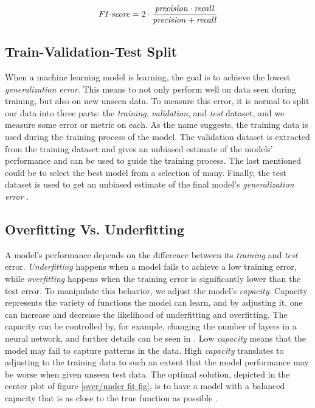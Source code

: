         \begin{equation}
            \textrm{\textit{F1-score}} = 2 \cdot \dfrac{\textrm{\textit{precision}} \cdot \textrm{\textit{recall}}}{\textrm{\textit{precision}} + \textrm{\textit{recall}}}
        \end{equation}
        
        
        
    \subsection{Train-Validation-Test Split}
        When a machine learning model is learning, the goal is to achieve the lowest \textit{generalization error}. This means to not only perform well on data seen during training, but also on new unseen data. To measure this error, it is normal to split our data into three parts: the \textit{training}, \textit{validation}, and \textit{test} dataset, and we measure some error or metric on each. As the name suggests, the training data is used during the training process of the model. The validation dataset is extracted from the training dataset and gives an unbiased estimate of the models' performance and can be used to guide the training process. The last mentioned could be to select the best model from a selection of many. Finally, the test dataset is used to get an unbiased estimate of the final model's \textit{generalization error} \cite{Goodfellow-et-al-2016}.
    
    \subsection{Overfitting Vs. Underfitting}
        A model's performance depends on the difference between its \textit{training} and \textit{test} error. \textit{Underfitting} happens when a model fails to achieve a low training error, while \textit{overfitting} happens when the training error is significantly lower than the test error. To manipulate this behavior, we adjust the model's \textit{capacity}. Capacity represents the variety of functions the model can learn, and by adjusting it, one can increase and decrease the likelihood of underfitting and overfitting. The capacity can be controlled by, for example, changing the number of layers in a neural network, and further details can be seen in \citeauthor{Goodfellow-et-al-2016} \cite{Goodfellow-et-al-2016}. Low \textit{capacity} means that the model may fail to capture patterns in the data. High \textit{capacity} translates to adjusting to the training data to such an extent that the model performance may be worse when given unseen test data. The optimal solution, depicted in the center plot of figure \ref{over/under fit fig}, is to have a model with a balanced capacity that is as close to the true function as possible \cite{Goodfellow-et-al-2016}. 
        
